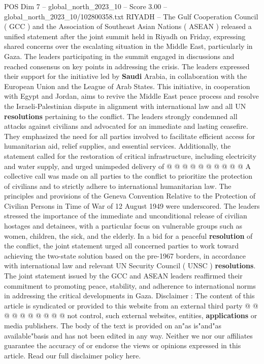 \begin{textsample}{POS Dim 7 – global\_north\_2023\_10 – Score 3.00 – global\_north\_2023\_10/102800358.txt}  \label{ex:f7_pos_423}
RIYADH -- The Gulf Cooperation Council ( GCC ) and the Association of Southeast Asian Nations ( ASEAN ) released a unified statement after the joint summit held in Riyadh on Friday, expressing shared concerns over the escalating situation in the Middle East, particularly in Gaza.
The leaders participating in the summit engaged in discussions and reached consensus on key points in addressing the crisis.
The leaders expressed their support for the initiative led by \textbf{Saudi} Arabia, in collaboration with the European Union and the League of Arab States.
This initiative, in cooperation with Egypt and Jordan, aims to revive the Middle East peace process and resolve the Israeli-Palestinian dispute in alignment with international law and all UN \textbf{resolutions} pertaining to the conflict.
The leaders strongly condemned all attacks against civilians and advocated for an immediate and lasting ceasefire.
They emphasized the need for all parties involved to facilitate efficient access for humanitarian aid, relief supplies, and essential services.
Additionally, the statement called for the restoration of critical infrastructure, including electricity and water supply, and urged unimpeded delivery of @ @ @ @ @ @ @ @ @ @ A collective call was made on all parties to the conflict to prioritize the protection of civilians and to strictly adhere to international humanitarian law.
The principles and provisions of the Geneva Convention Relative to the Protection of Civilian Persons in Time of War of 12 August 1949 were underscored.
The leaders stressed the importance of the immediate and unconditional release of civilian hostages and detainees, with a particular focus on vulnerable groups such as women, children, the sick, and the elderly.
In a bid for a peaceful \textbf{resolution} of the conflict, the joint statement urged all concerned parties to work toward achieving the two-state solution based on the pre-1967 borders, in accordance with international law and relevant UN Security Council ( UNSC ) \textbf{resolutions}.
The joint statement issued by the GCC and ASEAN leaders reaffirmed their commitment to promoting peace, stability, and adherence to international norms in addressing the critical developments in Gaza.
Disclaimer : The content of this article is syndicated or provided to this website from an external third party @ @ @ @ @ @ @ @ @ @ not control, such external websites, entities, \textbf{applications} or media publishers.
The body of the text is provided on an"as is"and"as available"basis and has not been edited in any way.
Neither we nor our affiliates guarantee the accuracy of or endorse the views or opinions expressed in this article.
Read our full disclaimer policy here.

\end{textsample}
